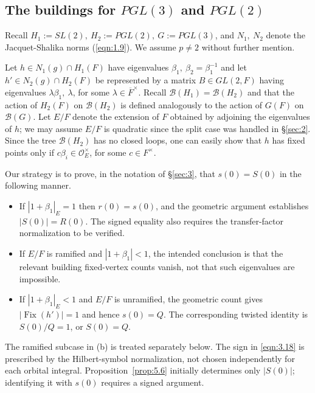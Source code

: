 \documentclass[12pt,letterpaper]{amsart}
\numberwithin{equation}{section}
\theoremstyle{definition}
\theoremstyle{plain}
\providecommand{\cal}{\mathcal}
\def\oee{{\cal O}_E}
\def\bbg{{\cal B}(G)}
\def\bbh{{\cal B}(H)}
\def\bbH1{{\cal B}(H_1)}
\def\bbh2{{\cal B}(H_2)}
\begin{document}
\subsection{The buildings for $PGL(3)$ and $PGL(2)$}
\label{sec:5}

Recall $H_1:=SL(2),\ H_2:=PGL(2),\ G:=PGL(3)$, and $N_1,\ N_2$
denote the Jacquet-Shalika norms (\ref{eqn:1.9}). 
We assume $p\not= 2$ without further mention.
 
Let $h \in N_1(g)\cap H_1(F)$ have eigenvalues $\beta_1,\
\beta_2=\beta_1^{-1}$ and
let $h'\in N_2(g)\cap H_2(F)$ be represented by a matrix $B\in GL(2,F)$
having eigenvalues $\lambda\beta_1,\ \lambda$, for some
$\lambda\in \overline{F}^{\times}$. 
Recall $\bbH1 = \bbh2$ and that the action
of $H_2(F)$ on $\bbh2$ is defined analogously to the action of $G(F)$
on $\bbg$. 
Let $E/F$ denote the extension of $F$ obtained by adjoining the
eigenvalues of $h$; we may assume $E/F$ 
is quadratic since the split case was
handled in \S \ref{sec:2}. 
Since the tree $\bbh2$ has no closed loops, one can easily
show that $h$ has fixed points only if 
$c\beta_i\in \oee^{\times}$, for some $c\in F^{\times}$.
 
Our strategy is
to prove, in the notation of \S \ref{sec:3}, that $s(0)=S(0)$ in the
following manner.

\begin{itemize}
\item[(a)] 
If $|1+\beta_1|_E=1$ then $r(0)=s(0)$, and the geometric argument
 establishes $|S(0)|=R(0)$. The signed equality also requires the
 transfer-factor normalization to be verified.

\item[(b)] 
If $E/F$ is ramified and $|1+\beta_1|<1$, the intended
conclusion is that the relevant building fixed-vertex counts vanish,
not that such eigenvalues are impossible. 

\item[(c)] 
If $|1+\beta_1|_E<1$ and $E/F$ is unramified, the geometric count
gives $|\operatorname{Fix}(h')|=1$ and hence $s(0)=Q$.
The corresponding twisted identity is $S(0)/Q=1$, or $S(0)=Q$. 

\end{itemize}
The ramified subcase in (b) is treated separately below.
The sign in \eqref{eqn:3.18} is prescribed by the Hilbert-symbol
normalization, not chosen independently for each orbital integral.
Proposition~\ref{prop:5.6} initially determines only $|S(0)|$;
identifying it with $s(0)$ requires a signed argument.
\end{document}
